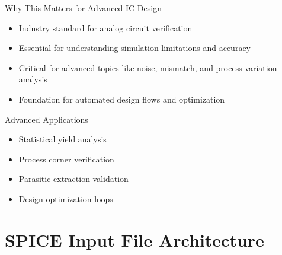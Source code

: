 \documentclass{beamer}
\begin{document}
\begin{frame}{Why This Matters for Advanced IC Design}
    \begin{itemize}
        \item Industry standard for analog circuit verification
        \item Essential for understanding simulation limitations and accuracy
        \item Critical for advanced topics like noise, mismatch, and process variation analysis
        \item Foundation for automated design flows and optimization
    \end{itemize}
    
    \begin{exampleblock}{Advanced Applications}
        \begin{itemize}
            \item Statistical yield analysis
            \item Process corner verification
            \item Parasitic extraction validation
            \item Design optimization loops
        \end{itemize}
    \end{exampleblock}
\end{frame}

\section{SPICE Input File Architecture}
\end{document}
